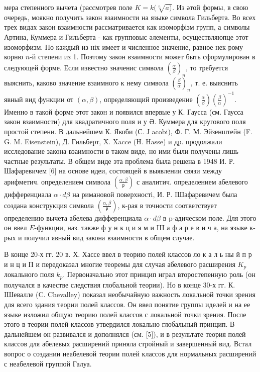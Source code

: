 \documentclass[10pt]{article}
\begin{document}
мера степенного вычета (рассмотрев поле $K=k(\sqrt[n]{a)}$. Из әтой формы, в свою очередь, моякно получить закон взаимности на языке символа Гильберта. Во всех трех видах закон взаимности рассматривается как изоморфізм групп, а символы Артина, Куммера и Гильберта - как групповыс әлементы, осуществляюпце этот изоморфизм. Но каждый из ніх имеет и численное значение, равное нек-рому корню $n$-й степени из 1. Поэтому закон взаимности может быть сформулирован в следующей форме. Если известно значенис символа $\left(\frac{\alpha}{\beta}\right)_{n}$, то требуется выяснить, каково значение взаимного к нему символа $\left(\frac{\beta}{\alpha}\right)_{n}$, т. е. выяснить явный вид функции от $(\alpha, \beta)$, определяющий произведение $\left(\frac{\alpha}{\beta}\right)\left(\frac{\beta}{\alpha}\right)^{-1}$. Именно в такой форме этот закон и появился впервые у К. Гаусса (см. Гаусса закон взаимности) для квадратичного поля и у Ә. Куммера для кругового поля простой степени. В дальнейшем К. Якоби (С. Ј acobi), Ф. Г. М. Эйзенштейн (F. G. M. Eisenstein), Д. Гильберт, X. Xacce (H. Hasse) и др. продолжали исследование закона взаимности в таком виде, но ими были получены лишь частные результаты. В общем виде эта проблема была решена в 1948 И. Р. Шафаревичем [6] на основе идеи, состоящей в выявлении связи между арифметич. определением символа $\left(\frac{\alpha, \beta}{\mathfrak{p}}\right)$ с аналитич. определением абелевого дифференциала $\alpha \cdot d \beta$ на римановой поверхності, И. Р. IШафаревичем была создана конструкция символа $\left(\frac{\alpha, \beta}{\mathfrak{p}}\right)$, к-рая в точности соответствует определению вычета абелева дифференциала $\alpha \cdot d \beta$ в p-адическом поле. Для этого он ввел $E$-функции, наз. также ф у н к ц и я м и III а ф а р е в и ч а, на языке к-рых и получил явный вид закона взаимности в общем случае.



В конце 20-х гг. 20 в. Х. Хассе ввел в теорию полей классов ло к а л ь ны й п р и н ц и П и передоказал многие теоремы для случая абелевого расширения $K_{p}$ локального поля $k_{p}$. Первоначально этот принцип играл второстепенную роль (он получался в качестве следствия глобальной теории). Но в конце 30-х гг. К. IШевалле (C. Chevalley) показал необычайную важность локальной точки зрения для всего здания теории полей классов. Он ввел понятие группы иделей и на ее языке изложил общую теорию полей классов с локальной точки зрения. После этого в теории полей классов утвердился локально глобальный принцип. В дальнейшем он развивался и дополнялся (см. [5]), и в результате теория полей классов для абелевых расширений приняла стройный и завершенный вид. Встал вопрос о создании неабелевой теории полей классов для нормальных расширений с неабелевой группой Галуа.
\end{document}
